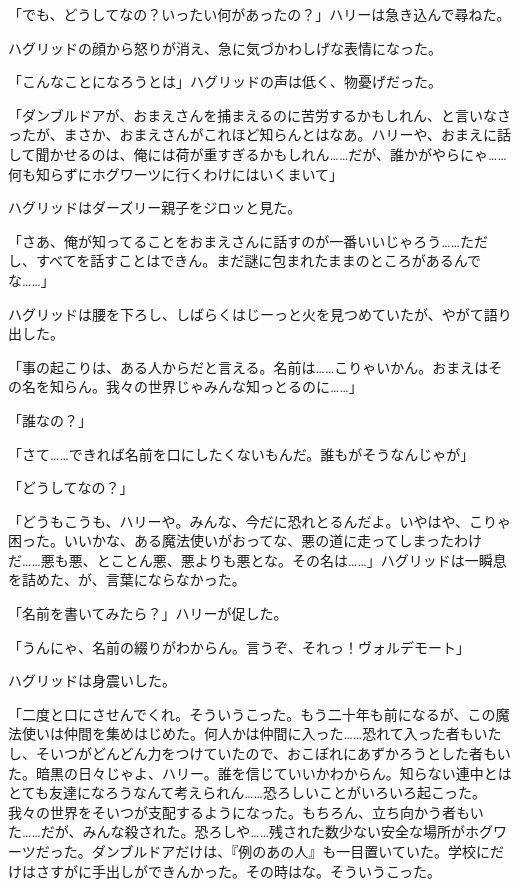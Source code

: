 \documentclass[10pt,a4paper]{article}
\begin{document}
\begin{CJK}{UTF8}{min}
「でも、どうしてなの？いったい何があったの？」ハリーは急き込んで尋ねた。

ハグリッドの顔から怒りが消え、急に気づかわしげな表情になった。

「こんなことになろうとは」ハグリッドの声は低く、物憂げだった。

「ダンブルドアが、おまえさんを捕まえるのに苦労するかもしれん、と言いなさったが、まさか、おまえさんがこれほど知らんとはなあ。ハリーや、おまえに話して聞かせるのは、俺には荷が重すぎるかもしれん……だが、誰かがやらにゃ……何も知らずにホグワーツに行くわけにはいくまいて」

ハグリッドはダーズリー親子をジロッと見た。

「さあ、俺が知ってることをおまえさんに話すのが一番いいじゃろう……ただし、すべてを話すことはできん。まだ謎に包まれたままのところがあるんでな……」

ハグリッドは腰を下ろし、しばらくはじーっと火を見つめていたが、やがて語り出した。

「事の起こりは、ある人からだと言える。名前は……こりゃいかん。おまえはその名を知らん。我々の世界じゃみんな知っとるのに……」

「誰なの？」

「さて……できれば名前を口にしたくないもんだ。誰もがそうなんじゃが」

「どうしてなの？」

「どうもこうも、ハリーや。みんな、今だに恐れとるんだよ。いやはや、こりゃ困った。いいかな、ある魔法使いがおってな、悪の道に走ってしまったわけだ……悪も悪、とことん悪、悪よりも悪とな。その名は……」ハグリッドは一瞬息を詰めた、が、言葉にならなかった。

「名前を書いてみたら？」ハリーが促した。

「うんにゃ、名前の綴りがわからん。言うぞ、それっ！ヴォルデモート」

ハグリッドは身震いした。

「二度と口にさせんでくれ。そういうこった。もう二十年も前になるが、この魔法使いは仲間を集めはじめた。何人かは仲間に入った……恐れて入った者もいたし、そいつがどんどん力をつけていたので、おこぼれにあずかろうとした者もいた。暗黒の日々じゃよ、ハリー。誰を信じていいかわからん。知らない連中とはとても友達になろうなんて考えられん……恐ろしいことがいろいろ起こった。我々の世界をそいつが支配するようになった。もちろん、立ち向かう者もいた……だが、みんな殺された。恐ろしや……残された数少ない安全な場所がホグワーツだった。ダンブルドアだけは、『例のあの人』も一目置いていた。学校にだけはさすがに手出しができんかった。その時はな。そういうこった。


\end{CJK}
\end{document}
